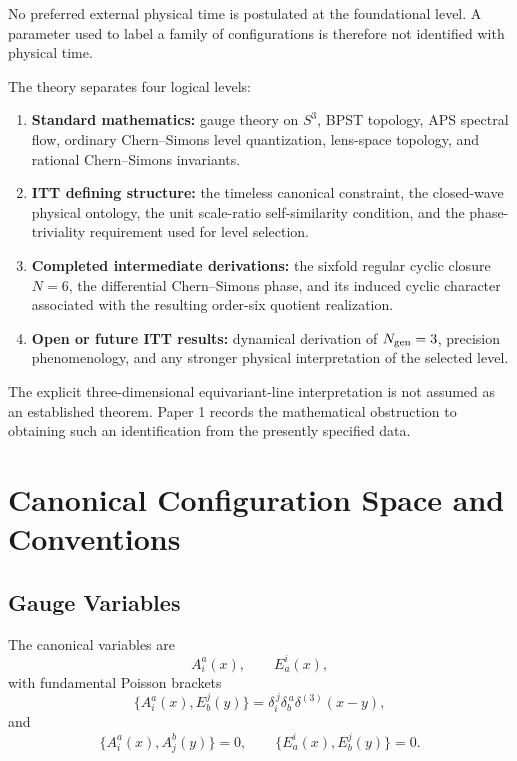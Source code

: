 \documentclass[11pt,a4paper]{article}
\begin{document}
No preferred external physical time is postulated at the foundational level. A parameter used to label a family of configurations is therefore not identified with physical time.

The theory separates four logical levels:
\begin{enumerate}[label=(\roman*)]
    \item \textbf{Standard mathematics:} gauge theory on $S^3$, BPST topology, APS spectral flow, ordinary Chern--Simons level quantization, lens-space topology, and rational Chern--Simons invariants.
    \item \textbf{ITT defining structure:} the timeless canonical constraint, the closed-wave physical ontology, the unit scale-ratio self-similarity condition, and the phase-triviality requirement used for level selection.
    \item \textbf{Completed intermediate derivations:} the sixfold regular cyclic closure $N=6$, the differential Chern--Simons phase, and its induced cyclic character associated with the resulting order-six quotient realization.
    \item \textbf{Open or future ITT results:} dynamical derivation of $N_{\rm gen}=3$, precision phenomenology, and any stronger physical interpretation of the selected level.
\end{enumerate}

The explicit three-dimensional equivariant-line interpretation is not assumed as an established theorem. Paper 1 records the mathematical obstruction to obtaining such an identification from the presently specified data.

\section{Canonical Configuration Space and Conventions}

\subsection{Gauge Variables}
The canonical variables are
\begin{equation}
A_i^a(x),\qquad E_a^i(x),
\end{equation}
with fundamental Poisson brackets
\begin{equation}
\{A_i^a(x),E_b^j(y)\}=\delta_i^{\,j}\delta_b^{\,a}\delta^{(3)}(x-y),
\end{equation}
and
\begin{equation}
\{A_i^a(x),A_j^b(y)\}=0,
\qquad
\{E_a^i(x),E_b^j(y)\}=0.
\end{equation}
\end{document}
